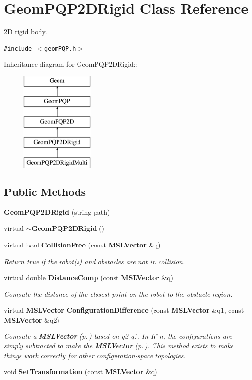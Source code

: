 \section{Geom\-PQP2DRigid  Class Reference}
\label{class_GeomPQP2DRigid}
2D rigid body. 


{\tt \#include $<$geom\-PQP.h$>$}

Inheritance diagram for Geom\-PQP2DRigid::\begin{figure}[H]
\begin{center}
\leavevmode
\includegraphics[height=5cm]{class_GeomPQP2DRigid}
\end{center}
\end{figure}
\subsection*{Public Methods}
\begin{CompactItemize}
\item 
{\bf Geom\-PQP2DRigid} (string path)
\item 
virtual {\bf $\sim$Geom\-PQP2DRigid} ()
\item 
virtual bool {\bf Collision\-Free} (const {\bf MSLVector} \&q)
\begin{CompactList}\small\item\em Return true if the robot(s) and obstacles are not in collision.\item\end{CompactList}\item 
virtual double {\bf Distance\-Comp} (const {\bf MSLVector} \&q)
\begin{CompactList}\small\item\em Compute the distance of the closest point on the robot to the obstacle region.\item\end{CompactList}\item 
virtual {\bf MSLVector} {\bf Configuration\-Difference} (const {\bf MSLVector} \&q1, const {\bf MSLVector} \&q2)
\begin{CompactList}\small\item\em Compute a {\bf MSLVector} {\rm (p.\,\pageref{class_MSLVector})} based on q2-q1. In R$^\wedge$n, the configurations are simply subtracted to make the {\bf MSLVector} {\rm (p.\,\pageref{class_MSLVector})}. This method exists to make things work correctly for other configuration-space topologies.\item\end{CompactList}\item 
void {\bf Set\-Transformation} (const {\bf MSLVector} \&q)
\end{CompactItemize}


